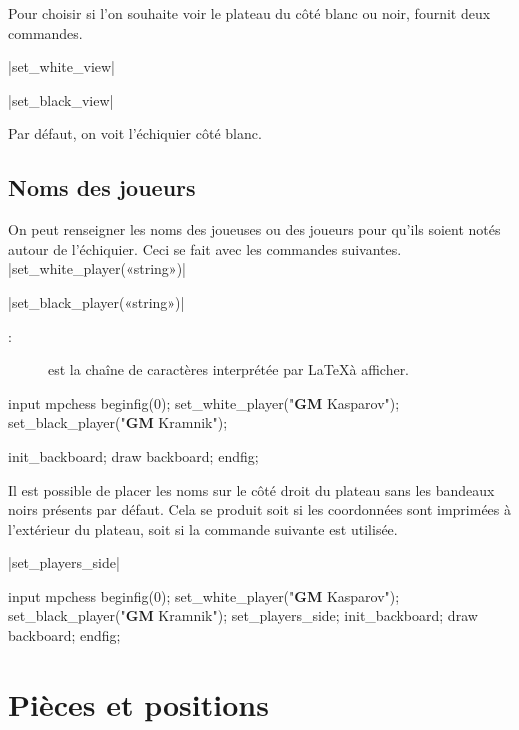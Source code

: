 \documentclass[french]{ltxdoc}
\begin{document}
Pour choisir si l’on souhaite voir le plateau du côté blanc ou noir, \mpchess fournit deux commandes.

\commande|set_white_view|\smallskip

\commande|set_black_view|\smallskip

Par défaut, on voit l’échiquier côté blanc.

\subsection{Noms des joueurs}

On peut renseigner les noms des joueuses ou des joueurs pour qu’ils soient notés
autour de l’échiquier. Ceci se fait avec les commandes suivantes.
\commande|set_white_player(«string»)|\smallskip

\commande|set_black_player(«string»)|\smallskip

\begin{description}
  \item[ :] est la chaîne de caractères interprétée par \LaTeX à afficher.
\end{description}

\begin{ExempleMP}
input mpchess
beginfig(0);
set_white_player("\textbf{GM} Kasparov");
set_black_player("\textbf{GM} Kramnik");

init_backboard;
draw backboard;
endfig;
\end{ExempleMP}

Il est possible de placer les noms sur le côté droit du plateau sans les
bandeaux noirs présents par défaut. Cela se produit soit si les coordonnées sont
imprimées à l’extérieur du plateau, soit si la commande suivante est utilisée.

\commande|set_players_side|\smallskip

\begin{ExempleMP}[righthand width=0.6\linewidth]
input mpchess
beginfig(0);
set_white_player("\textbf{GM} Kasparov");
set_black_player("\textbf{GM} Kramnik");
set_players_side;
init_backboard;
draw backboard;
endfig;
\end{ExempleMP}



\section{Pièces et positions}
\end{document}
